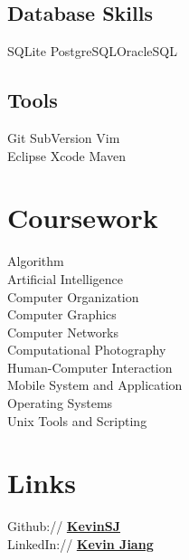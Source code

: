\documentclass[]{deedy-resume-openfont}
\begin{document}
\begin{minipage}[t]{0.32\textwidth}
\subsection{Database Skills}
SQLite \textbullet{}PostgreSQL\textbullet{}OracleSQL
\sectionsep

\subsection{Tools}
Git \textbullet{} SubVersion  \textbullet{} Vim \\
Eclipse \textbullet{} Xcode \textbullet{} Maven
\sectionsep


\section{Coursework}
Algorithm			\\
Artificial Intelligence  \\
Computer Organization	\\
Computer Graphics	\\
Computer Networks	\\
Computational Photography \\
Human-Computer Interaction \\
Mobile System and Application \\
Operating Systems \\
Unix Tools and Scripting \\
\sectionsep


\section{Links} 
Github:// \href{https://github.com/kevinsj}{\bf KevinSJ} \\
LinkedIn://  \href{https://www.linkedin.com/in/kevsj}{\bf Kevin Jiang} \\
\sectionsep

%
%

\end{minipage} 
\hfill
\end{document}
